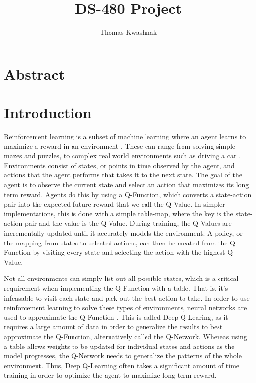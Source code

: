 \documentclass[12pt]{article}
\author{Thomas Kwashnak}
\title{DS-480 Project}
\begin{document}
\maketitle

\newpage

\tableofcontents

\newpage

\section{Abstract}

\section{Introduction}

Reinforcement learning is a subset of machine learning where an agent learns to maximize a reward in an environment \cite{article_reinforcement_learning_survey}.
These can range from solving simple mazes and puzzles, to complex real world environments such as driving a car \cite{article_deep_learning_hybrid_quantum}.
Environments consist of states, or points in time observed by the agent, and actions that the agent performs that takes it to the next state.
The goal of the agent is to observe the current state and select an action that maximizes its long term reward.
Agents do this by using a Q-Function, which converts a state-action pair into the expected future reward that we call the Q-Value.
In simpler implementations, this is done with a simple table-map, where the key is the state-action pair and the value is the Q-Value.
During training, the Q-Values are incrementally updated until it accurately models the environment.
A policy, or the mapping from states to selected actions, can then be created from the Q-Function by visiting every state and selecting the action with the highest Q-Value.

Not all environments can simply list out all possible states, which is a critical requirement when implementing the Q-Function with a table.
That is, it's infeasable to visit each state and pick out the best action to take.
In order to use reinforcement learning to solve these types of environments, neural networks are used to approximate the Q-Function \cite{article_reinforcement_learning_for_robots}.
This is called Deep Q-Learing, as it requires a large amount of data in order to generalize the results to best approximate the Q-Function, alternatively called the Q-Network.
Whereas using a table allows weights to be updated for individual states and actions as the model progresses, the Q-Network needs to generalize the patterns of the whole environment.
Thus, Deep Q-Learning often takes a significant amount of time training in order to optimize the agent to maximize long term reward.
\end{document}
